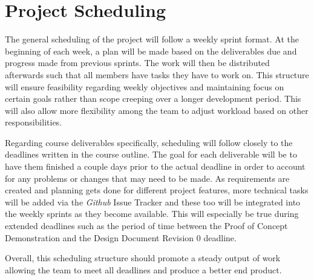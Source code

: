 \documentclass{article}
\begin{document}
\section{Project Scheduling}

The general scheduling of the project will follow a weekly sprint format. At the beginning
of each week, a plan will be made based on the deliverables due and progress made from previous sprints. The
work will then be distributed afterwards such that all members have tasks they have
to work on. This structure will ensure feasibility regarding weekly
objectives and maintaining focus on certain goals rather than scope creeping over
a longer development period. This will also allow more flexibility among the team to adjust workload
based on other responsibilities. \par

Regarding course deliverables specifically, scheduling will follow closely to the deadlines written in the
course outline. The goal for each deliverable will be to have them finished a couple days
prior to the actual deadline in order to account for any problems or changes that may
need to be made. As requirements are created and planning gets done for different project features,
more technical tasks will be added via the \emph{Github} Issue Tracker and these too will be
integrated into the weekly sprints as they become available. This will especially be true during
extended deadlines such as the period of time between the Proof of Concept Demonstration and
the Design Document Revision 0 deadline. \par

Overall, this scheduling structure should promote a steady output of work allowing the team
to meet all deadlines and produce a better end product.
\end{document}
